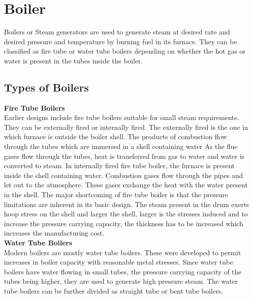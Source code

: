\documentclass[english,11pt]{report}
\begin{document}
\chapter{Boiler}
Boilers or Steam generators are used to generate steam at desired rate and desired pressure
and temperature by burning fuel in its furnace. They can be classified as fire tube or water tube
boilers depending on whether the hot gas or water is present in the tubes inside the boiler.\\

\section{Types of Boilers}
\textbf{Fire Tube Boilers}\\
Earlier designs include fire tube boilers suitable for small steam requirements. They can be
externally fired or internally fired. The externally fired is the one in which furnace is outside the boiler shell. The products of combustion flow through the tubes which are immersed in a shell
containing water As the flue gases flow through the tubes, heat is transferred from gas to water
and water is converted to steam. In internally fired fire tube boiler, the furnace is present inside the shell containing water. Combustion gases flow through the pipes and let out to the
atmosphere. These gases exchange the heat with the water present in the shell. The major
shortcoming of fire tube boiler is that the pressure limitations are inherent in its basic design.
The steam present in the drum exerts hoop stress on the shell and larger the shell, larger is the
stresses induced and to increase the pressure carrying capacity, the thickness has to be
increased which increases the manufacturing cost.\\[1em]
\textbf{Water Tube Boilers}\\
Modern boilers are mostly water tube boilers. These were developed to permit increases in
boiler capacity with reasonable metal stresses. Since water tube boilers have water flowing in
small tubes, the pressure carrying capacity of the tubes being higher, they are used to generate
high pressure steam. The water tube boilers can be further divided as straight tube or bent tube
boilers.\\
\end{document}
